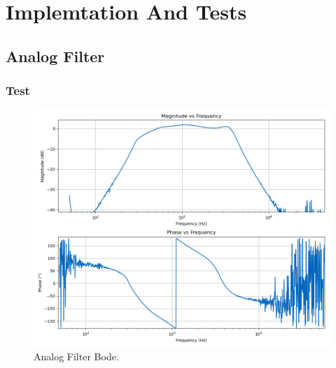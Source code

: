 \section{Implemtation And Tests}

\subsection{Analog Filter}

\subsubsection{Test}

\begin{figure}[H]
    \centering
    \includegraphics*[scale = 0.5]{Images/AnalogFilterScoppyBode.png}
    \caption{Analog Filter Bode.}
    \label{fig:AnalogFilterBodeScoppy}
\end{figure}

